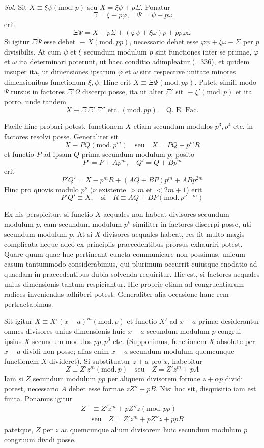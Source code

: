 \emph{Sol.} Sit $X\equiv\xi\psi(\mathrm{mod.}\,p)$ seu $X=\xi\psi+p\Sigma$. Ponatur
\[
\Xi=\xi+p\varphi,\quad\Psi=\psi+p\omega
\]
erit
\[
\Xi\Psi=X-p\Sigma+(\varphi\psi+\xi\omega)p+pp\varphi\omega
\]
Si igitur $\Xi\Psi$ esse debet $\equiv X(\mathrm{mod.}\,pp)$, necessario debet esse $\varphi\psi+\xi\omega-\Sigma$ per $p$ divisibilis. At cum $\psi$ et $\xi$ secundum modulum $p$ sint functiones inter se primae, $\varphi$ et $\omega$ ita determinari poterunt, ut haec conditio adimpleatur (\textsection.\ 336), et quidem insuper ita, ut dimensiones ipsarum $\varphi$ et $\omega$ sint respective unitate minores dimensionibus functionum $\xi,\psi$. Hinc erit $X\equiv\Xi\Psi(\mathrm{mod.}\,pp)$. Patet, simili modo $\Psi$ rursus in factores $\Xi'\Omega$ discerpi posse, ita ut alter $\Xi'$ sit $\equiv\xi'(\mathrm{mod.}\,p)$ et ita porro, unde tandem
\[
X\equiv\Xi\,\Xi'\,\Xi''\text{ etc.}\;(\mathrm{mod.}\,pp).\quad\text{Q. E. Fac.}
\]

Facile hinc probari potest, functionem $X$ etiam secundum modulos $p^3,p^4$ etc. in factores resolvi posse. Generaliter sit
\[
X\equiv PQ(\mathrm{mod.}\,p^m)\quad\text{seu}\quad X=PQ+p^mR
\]
et functio $P$ ad ipsam $Q$ prima secundum modulum $p$; posito
\[
P'=P+Ap^m,\quad Q'=Q+Bp^m
\]
erit
\[
P'Q'=X-p^mR+(AQ+BP)p^m+ABp^{2m}
\]
Hinc pro quovis modulo $p^\nu$ ($\nu$ existente $>m$ et $<2m+1$) erit
\[
P'Q'\equiv X,\quad\text{si}\quad R\equiv AQ+BP(\mathrm{mod.}\,p^{\nu-m})
\]

%
Ex his perspicitur, si functio $X$ aequales non habeat divisores secundum modulum $p$, eam secundum modulum $p^k$ similiter in factores discerpi posse, uti secundum modulum $p$. At si $X$ divisores aequales habeat, res fit multo magis complicata neque adeo ex principiis praecedentibus prorsus exhauriri potest. Quare quum quae huc pertineant cuncta communicare non possimus, unicum casum tantummodo considerabimus, qui plurimum occurrit cuiusque enodatio ad quaedam in praecedentibus dubia solvenda requiritur. Hic est, si factores aequales unius dimensionis tantum respiciantur. Hic proprie etiam ad congruentiarum radices inveniendas adhiberi potest. Generaliter alia occasione hanc rem pertractabimus.

Sit igitur $X\equiv X'(x-a)^m(\mathrm{mod.}\,p)$ et functio $X'$ ad $x-a$ prima: desiderantur omnes divisores unius dimensionis huic $x-a$ secundum modulum $p$ congrui ipsius $X$ secundum modulos $pp,p^3$ etc. (Supponimus, functionem $X$ absolute per $x-a$ dividi non posse; alias enim $x-a$ secundum modulum quemcunque functionem $X$ divideret). Si substituatur $z+a$ pro $x$, habebitur
\[
Z\equiv Z'z^m(\mathrm{mod.}\,p)\quad\text{seu}\quad Z=Z'z^m+pA
\]
Iam si $Z$ secundum modulum $pp$ per aliquem divisorem formae $z+\alpha p$ dividi potest, necessario $A$ debet esse formae $zZ''+pB$. Nisi hoc sit, disquisitio iam est finita. Ponamus igitur
\[
\begin{aligned}
Z&\equiv Z'z^m+pZ''z(\mathrm{mod.}\,pp)\\
&\text{seu}\quad Z=Z'z^m+pZ''z+ppB
\end{aligned}
\]
patetque, $Z$ per $z$ ac quemcunque alium divisorem huic secundum modulum $p$ congruum dividi posse.

